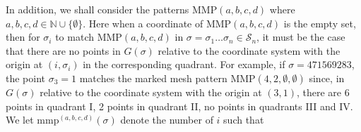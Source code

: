 \documentclass[
final,nomarks
]{dmtcs-episciences}
\newcommand{\Sn}[1]{\mathcal{S}_{#1}}
\newcommand{\MMP}{\mathrm{MMP}}
\newcommand{\mmp}{\mathrm{mmp}}
\begin{document}
In addition, we shall consider the patterns  \begin{math}\MMP(a,b,c,d)\end{math} where 
\begin{math}a,b,c,d \in \mathbb{N} \cup \{\emptyset\}\end{math}. Here when 
a coordinate of \begin{math}\MMP(a,b,c,d)\end{math} is the empty set, then for \begin{math}\sigma_i\end{math} to match  
\begin{math}\MMP(a,b,c,d)\end{math} in \begin{math}\sigma = \sigma_1 \ldots \sigma_n \in \Sn{n}\end{math}, 
it must be the case that there are no points in \begin{math}G(\sigma)\end{math} relative 
to the coordinate system with the origin at \begin{math}(i,\sigma_i)\end{math} in the corresponding 
quadrant. For example, if \begin{math}\sigma = 471569283\end{math}, the point 
\begin{math}\sigma_3 =1\end{math} matches 
the marked mesh pattern \begin{math}\MMP(4,2,\emptyset,\emptyset)\end{math} since,  
in \begin{math}G(\sigma)\end{math} relative 
to the coordinate system with the origin at \begin{math}(3,1)\end{math}, 
there are 6 points in quadrant I, 
2 points in quadrant II, no  points in quadrants III  and IV.   We let 
\begin{math}\mmp^{(a,b,c,d)}(\sigma)\end{math} denote the number of \begin{math}i\end{math} such that 
\end{document}
